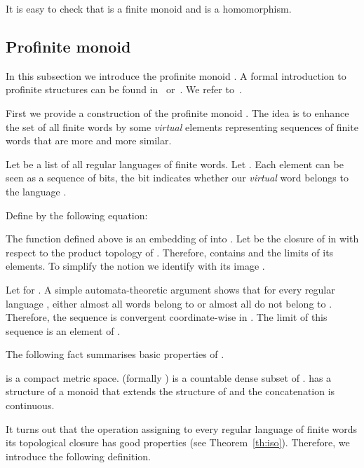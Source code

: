 \documentclass{LMCS}
\begin{document}
It is easy to check that  is a finite monoid and  is a homomorphism.

\subsection{Profinite monoid}

In this subsection we introduce the profinite monoid . A formal introduction to profinite structures can be found in~\cite{almeida_profinite} or~\cite{pin_profinite}. We refer to~\cite{pin_profinite}.

First we provide a construction of the profinite monoid . The idea is to enhance the set of all finite words by some \emph{virtual} elements representing sequences of finite words that are more and more similar.

Let  be a list of all regular languages of finite words. Let . Each element  can be seen as a sequence of bits, the bit  indicates whether our \emph{virtual} word belongs to the language .

Define  by the following equation:


The function  defined above is an embedding of  into . Let  be the closure of  in  with respect to the product topology of . Therefore,  contains  and the limits of its elements. To simplify the notion we identify  with its image .

\begin{example}\label{ex:factorial}
Let  for . A simple automata-theoretic argument shows that for every regular language , either almost all words  belong to  or almost all do not belong to . Therefore, the sequence  is convergent coordinate-wise in . The limit of this sequence is an element of .
\end{example}

The following fact summarises basic properties of .

\begin{fact}
 is a compact metric space.  (formally ) is a countable dense subset of .  has a structure of a monoid that extends the structure of  and the concatenation is continuous.
\end{fact}

It turns out that the operation assigning to every regular language of finite words  its topological closure  has good properties (see Theorem~\ref{th:iso}). Therefore, we introduce the following definition.
\end{document}
